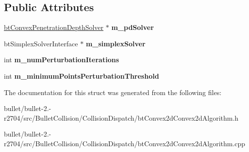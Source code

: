 \subsection*{Public Attributes}
\begin{DoxyCompactItemize}
\item 
\hypertarget{structbt_convex2d_convex2d_algorithm_1_1_create_func_a15770561e8794a528f34a6fcda0ffea0}{\hyperlink{classbt_convex_penetration_depth_solver}{bt\+Convex\+Penetration\+Depth\+Solver} $\ast$ {\bfseries m\+\_\+pd\+Solver}}\label{structbt_convex2d_convex2d_algorithm_1_1_create_func_a15770561e8794a528f34a6fcda0ffea0}

\item 
\hypertarget{structbt_convex2d_convex2d_algorithm_1_1_create_func_a68036057e352d7d2e33f803a60a6d37e}{bt\+Simplex\+Solver\+Interface $\ast$ {\bfseries m\+\_\+simplex\+Solver}}\label{structbt_convex2d_convex2d_algorithm_1_1_create_func_a68036057e352d7d2e33f803a60a6d37e}

\item 
\hypertarget{structbt_convex2d_convex2d_algorithm_1_1_create_func_a53e70c03f177dbdc5f59058e33b0b5b1}{int {\bfseries m\+\_\+num\+Perturbation\+Iterations}}\label{structbt_convex2d_convex2d_algorithm_1_1_create_func_a53e70c03f177dbdc5f59058e33b0b5b1}

\item 
\hypertarget{structbt_convex2d_convex2d_algorithm_1_1_create_func_ad811e694cf9b3ba17294be04a9b04d6a}{int {\bfseries m\+\_\+minimum\+Points\+Perturbation\+Threshold}}\label{structbt_convex2d_convex2d_algorithm_1_1_create_func_ad811e694cf9b3ba17294be04a9b04d6a}

\end{DoxyCompactItemize}


The documentation for this struct was generated from the following files\+:\begin{DoxyCompactItemize}
\item 
bullet/bullet-\/2.-\/r2704/src/\+Bullet\+Collision/\+Collision\+Dispatch/bt\+Convex2d\+Convex2d\+Algorithm.\+h\item 
bullet/bullet-\/2.-\/r2704/src/\+Bullet\+Collision/\+Collision\+Dispatch/bt\+Convex2d\+Convex2d\+Algorithm.\+cpp\end{DoxyCompactItemize}
